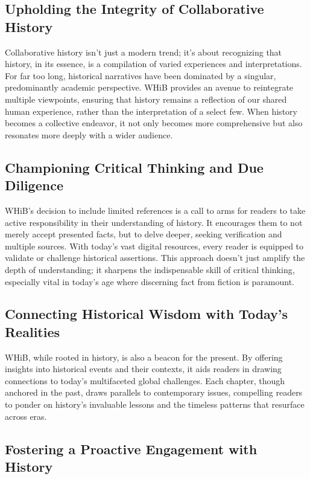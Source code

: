 \documentclass[a4paper,12pt]{book}
\begin{document}
\subsection*{Upholding the Integrity of Collaborative History}

Collaborative history isn't just a modern trend; it's about recognizing that history, in its essence, is a compilation of varied experiences and interpretations. For far too long, historical narratives have been dominated by a singular, predominantly academic perspective. WHiB provides an avenue to reintegrate multiple viewpoints, ensuring that history remains a reflection of our shared human experience, rather than the interpretation of a select few. When history becomes a collective endeavor, it not only becomes more comprehensive but also resonates more deeply with a wider audience.

\subsection*{Championing Critical Thinking and Due Diligence}

WHiB's decision to include limited references is a call to arms for readers to take active responsibility in their understanding of history. It encourages them to not merely accept presented facts, but to delve deeper, seeking verification and multiple sources. With today's vast digital resources, every reader is equipped to validate or challenge historical assertions. This approach doesn't just amplify the depth of understanding; it sharpens the indispensable skill of critical thinking, especially vital in today's age where discerning fact from fiction is paramount.

\subsection*{Connecting Historical Wisdom with Today's Realities}

WHiB, while rooted in history, is also a beacon for the present. By offering insights into historical events and their contexts, it aids readers in drawing connections to today's multifaceted global challenges. Each chapter, though anchored in the past, draws parallels to contemporary issues, compelling readers to ponder on history's invaluable lessons and the timeless patterns that resurface across eras.

\subsection*{Fostering a Proactive Engagement with History}
\end{document}
